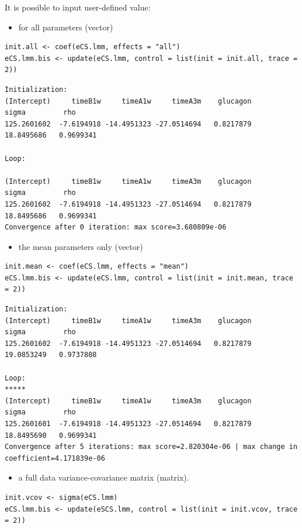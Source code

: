 \documentclass[12pt]{article}
\begin{document}
It is possible to input user-defined value:
\begin{itemize}
\item for all parameters (vector)
\end{itemize}
\lstset{language=r,label= ,caption= ,captionpos=b,numbers=none}
\begin{lstlisting}
init.all <- coef(eCS.lmm, effects = "all")
eCS.lmm.bis <- update(eCS.lmm, control = list(init = init.all, trace = 2))
\end{lstlisting}

\begin{verbatim}
Initialization:
(Intercept)     timeB1w     timeA1w     timeA3m    glucagon       sigma         rho 
125.2601602  -7.6194918 -14.4951323 -27.0514694   0.8217879  18.8495686   0.9699341 

Loop:

(Intercept)     timeB1w     timeA1w     timeA3m    glucagon       sigma         rho 
125.2601602  -7.6194918 -14.4951323 -27.0514694   0.8217879  18.8495686   0.9699341 
Convergence after 0 iteration: max score=3.680809e-06
\end{verbatim}


\begin{itemize}
\item the mean parameters only (vector)
\end{itemize}
\lstset{language=r,label= ,caption= ,captionpos=b,numbers=none}
\begin{lstlisting}
init.mean <- coef(eCS.lmm, effects = "mean")
eCS.lmm.bis <- update(eCS.lmm, control = list(init = init.mean, trace = 2))
\end{lstlisting}

\begin{verbatim}
Initialization:
(Intercept)     timeB1w     timeA1w     timeA3m    glucagon       sigma         rho 
125.2601602  -7.6194918 -14.4951323 -27.0514694   0.8217879  19.0853249   0.9737808 

Loop:
*****
(Intercept)     timeB1w     timeA1w     timeA3m    glucagon       sigma         rho 
125.2601601  -7.6194918 -14.4951323 -27.0514694   0.8217879  18.8495690   0.9699341 
Convergence after 5 iterations: max score=2.820304e-06 | max change in coefficient=4.171839e-06
\end{verbatim}


\begin{itemize}
\item a full data variance-covariance matrix (matrix).
\end{itemize}
\lstset{language=r,label= ,caption= ,captionpos=b,numbers=none}
\begin{lstlisting}
init.vcov <- sigma(eCS.lmm)
eCS.lmm.bis <- update(eSCS.lmm, control = list(init = init.vcov, trace = 2))
\end{lstlisting}
\end{document}
